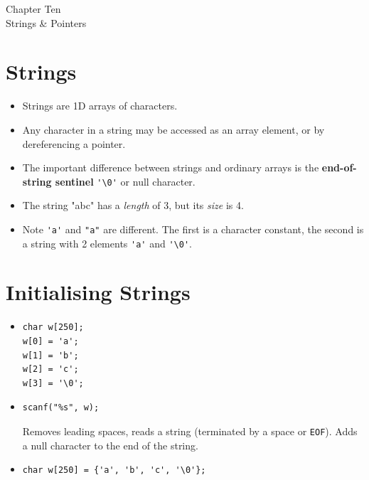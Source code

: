 \documentclass[a4,portraitt]{slides}
\begin{document}
\newpage
\begin{center}
{\Large Chapter Ten \\ Strings \& Pointers}
\end{center}
\vspace{-0.5in}
\section*{Strings}
\begin{itemize}
\item Strings are 1D arrays of characters.
\item Any character in a string may be accessed as an array
element, or by dereferencing a pointer.
\item The important difference between strings and ordinary arrays
is the {\bf end-of-string sentinel} \verb^'\0'^ or null character.
\end{itemize}

\newpage
\begin{itemize}
\item The string "abc" has a {\it length} of 3, but its {\it size} is 4.
\item Note \verb^'a'^ and \verb^"a"^ are different. The first is a
character constant, the second is a string with 2 elements
\verb^'a'^ and \verb^'\0'^.
\end{itemize}

\newpage
\section*{Initialising Strings}
\begin{itemize}
\item \begin{verbatim}
char w[250];
w[0] = 'a';
w[1] = 'b';
w[2] = 'c';
w[3] = '\0';
\end{verbatim}
\item \begin{verbatim}
scanf("%s", w);
\end{verbatim}
Removes leading spaces, reads a string (terminated by a
space or \verb^EOF^). Adds a null character to the end
of the string.
\item \begin{verbatim}
char w[250] = {'a', 'b', 'c', '\0'};
\end{verbatim}
\end{itemize}
\end{document}

